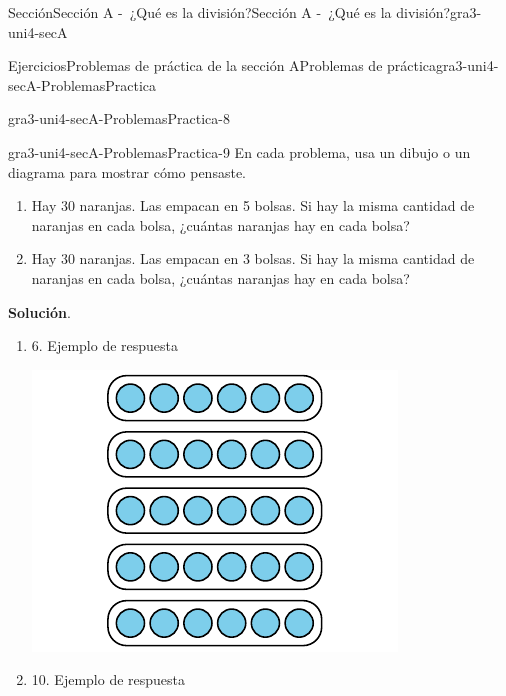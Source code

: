 \documentclass[oneside,10pt,]{article}
\newcommand{\blocktitlefont}{\relax}
\begin{document}
\begin{sectionptx}{Sección}{Sección A -~¿Qué es la división?}{}{Sección A -~¿Qué es la división?}{}{}{gra3-uni4-secA}
\begin{exercises-subsection}{Ejercicios}{Problemas de práctica de la sección A}{}{Problemas de práctica}{}{}{gra3-uni4-secA-ProblemasPractica}
\begin{divisionexercise}{6}{}{}{gra3-uni4-secA-ProblemasPractica-8}
\begin{enumerate}[label={(\alph*)}]
\begin{image}{0}{1}{0}{}
\end{image}%
\end{enumerate}
\end{divisionexercise}%
\begin{divisionexercise}{7}{}{}{gra3-uni4-secA-ProblemasPractica-9}%
En cada problema, usa un dibujo o un diagrama para mostrar cómo pensaste.%
%
\begin{enumerate}[label={(\alph*)}]
\item{}Hay 30 naranjas. Las empacan en 5 bolsas. Si hay la misma cantidad de naranjas en cada bolsa, ¿cuántas naranjas hay en cada bolsa?%
\item{}Hay 30 naranjas. Las empacan en 3 bolsas. Si hay la misma cantidad de naranjas en cada bolsa, ¿cuántas naranjas hay en cada bolsa?%
\end{enumerate}
\par\smallskip%
\noindent\textbf{\blocktitlefont Solución}.\hypertarget{gra3-uni4-secA-ProblemasPractica-9-2}{}\quad{}%
\begin{enumerate}[label={(\alph*)}]
\item{}6. Ejemplo de respuesta%
\begin{image}{0}{1}{0}{}%
\includegraphics[width=\linewidth]{external/svg-source/tikz-file-152432.pdf}
\end{image}%
\item{}10. Ejemplo de respuesta%
\begin{image}{0}{1}{0}{}%

\end{image}
\end{enumerate}
\end{divisionexercise}
\end{exercises-subsection}
\end{sectionptx}
\end{document}
